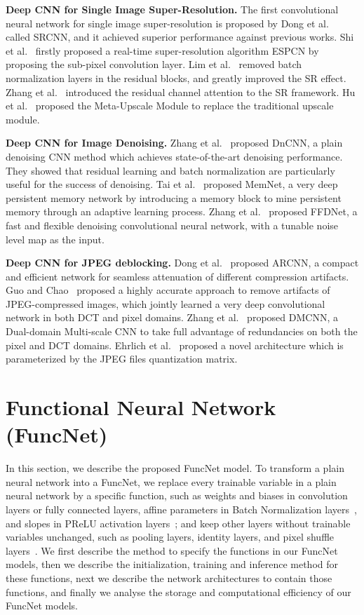 \documentclass{article}
\begin{document}
\textbf{Deep CNN for Single Image Super-Resolution.} The first convolutional neural network for single image super-resolution is proposed by Dong et al.~\cite{dong2014learning} called SRCNN, and it achieved superior performance against previous works. Shi et al.~\cite{shi2016real} firstly proposed a real-time super-resolution algorithm ESPCN by proposing the sub-pixel convolution layer. Lim et al.~\cite{lim2017enhanced} removed batch normalization layers in the residual blocks, and greatly improved the SR effect. Zhang et al.~\cite{zhang2018image} introduced the residual channel attention to the SR framework. Hu et al.~\cite{hu2019meta} proposed the Meta-Upscale Module to replace the traditional upscale module.

\textbf{Deep CNN for Image Denoising.} Zhang et al.~\cite{zhang2017beyond} proposed DnCNN, a plain denoising CNN method which achieves state-of-the-art denoising performance. They showed that residual learning and batch normalization are particularly useful for the success of denoising. Tai et al.~\cite{tai2017memnet} proposed MemNet, a very deep persistent memory network by introducing a memory block to mine persistent memory through an adaptive learning process. Zhang et al.~\cite{zhang2018ffdnet} proposed FFDNet, a fast and flexible denoising convolutional neural network, with a tunable noise level map as the input.

\textbf{Deep CNN for JPEG deblocking.} Dong et al.~\cite{dong2015compression} proposed ARCNN, a compact and efficient network for seamless attenuation of different compression artifacts. Guo and Chao~\cite{guo2016building} proposed a highly accurate approach to remove artifacts of JPEG-compressed images, which jointly learned a very deep convolutional network in both DCT and pixel domains. Zhang et al.~\cite{zhang2018dmcnn} proposed DMCNN, a Dual-domain Multi-scale CNN to take full advantage of redundancies on both the pixel and DCT domains. Ehrlich et al.~\cite{ehrlich2020quantization} proposed a novel architecture which is parameterized by the JPEG files quantization matrix.

\section{Functional Neural Network (FuncNet)}
\label{sec:3}

In this section, we describe the proposed FuncNet model. To transform a plain neural network into a FuncNet, we replace every trainable variable in a plain neural network by a specific function, such as weights and biases in convolution layers or fully connected layers, affine parameters in Batch Normalization layers~\cite{ioffe2015batch}, and slopes in PReLU activation layers~\cite{he2015delving}; and keep other layers without trainable variables unchanged, such as pooling layers, identity layers, and pixel shuffle layers~\cite{shi2016real}. We first describe the method to specify the functions in our FuncNet models, then we describe the initialization, training and inference method for these functions, next we describe the network architectures to contain those functions, and finally we analyse the storage and computational efficiency of our FuncNet models.
\end{document}
